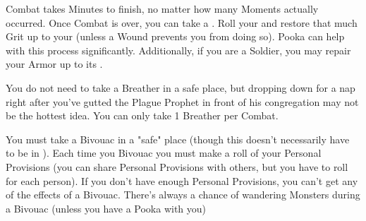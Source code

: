 {  



  Combat takes Minutes to finish, no matter how many Moments actually occurred.  Once Combat is over, you can take a .  Roll your \FLESH and restore that much Grit up to your \MAX (unless a Wound prevents you from doing so). Pooka can help with this process significantly. Additionally, if you are a Soldier, you may repair your Armor up to its \MAX \UD.   

  You do not need to take a Breather in a safe place, but dropping down for a nap right after you've gutted the Plague Prophet in front of his congregation may not be the hottest idea.  You can only take 1 Breather per Combat.  


  You must take a Bivouac in a "safe" place (though this doesn't necessarily have to be in ).  Each time you Bivouac you must make a \UD roll of your Personal Provisions (you can share Personal Provisions with others, but you have to roll for each person).  If you don't have enough Personal Provisions, you can't get any of the effects of a Bivouac.  There's always a chance of wandering Monsters during a Bivouac (unless you have a Pooka with you)


  \cbreak



}
